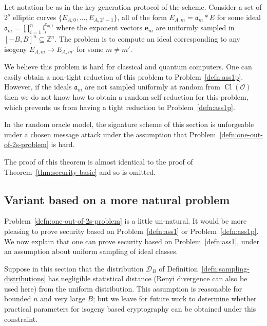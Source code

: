 \documentclass{llncs}
\newcommand{\D}{\mathcal{D}}
\newcommand{\OO}{\mathcal{O}}
\newcommand{\Z}{\mathbb{Z}}
\DeclareMathOperator{\Cl}{Cl}
\renewcommand{\a}{\mathfrak{a}}
\renewcommand{\l}{\mathfrak{l}}
\newcommand{\e}{\mathbf{e}}
\begin{document}
\begin{problem}\label{defn:one-out-of-2s-problem}
Let notation be as in the key generation protocol of the scheme.
Consider a set of $2^s$ elliptic curves $\{ E_{A,0}, \dots, E_{A,2^s-1} \}$, all of the form $E_{A,m} = \a_m * E$ for some ideal $\a_m = \prod_{i=1}^n \l_i^{e_{m,i}}$ where the exponent vectors $\e_m $ are uniformly sampled in $[-B,B]^n \subseteq \Z^n$.
The 
problem is to compute an ideal corresponding to any isogeny $E_{A,m} \to E_{A,m'}$ for some $m \ne m'$.
\end{problem}



We believe this problem is hard for classical and quantum computers. One can easily obtain a non-tight reduction of this problem to Problem~\ref{defn:ass1p}.
However, if the ideals $\a_m$ are not sampled uniformly at random from $\Cl(\OO)$ then we do not know how to obtain a random-self-reduction for this problem, which prevents us from having a tight reduction to Problem~\ref{defn:ass1p}.


\begin{theorem}\label{thm2}
In the random oracle model, the signature scheme of this section is unforgeable under a chosen message attack under the assumption that Problem~\ref{defn:one-out-of-2s-problem} is hard.
\end{theorem}

The proof of this theorem is almost identical to the proof of Theorem~\ref{thm:security-basic} and so is omitted.



\subsection{Variant based on a more natural problem} \label{sec:natural-problem}


Problem~\ref{defn:one-out-of-2s-problem} is a little un-natural.
It would be more pleasing to prove security based on Problem~\ref{defn:ass1} or Problem~\ref{defn:ass1p}.
We now explain that one can prove security based on Problem~\ref{defn:ass1}, under an assumption about uniform sampling of ideal classes.

Suppose in this section that the distribution $\D_B$ of Definition~\ref{defn:sampling-distributions} has negligible statistical distance (Renyi divergence can also be used here) from the uniform distribution.
This assumption is reasonable for bounded $n$ and very large $B$; but we leave for future work to determine whether practical parameters for isogeny based cryptography can be obtained under this constraint.
\end{document}
